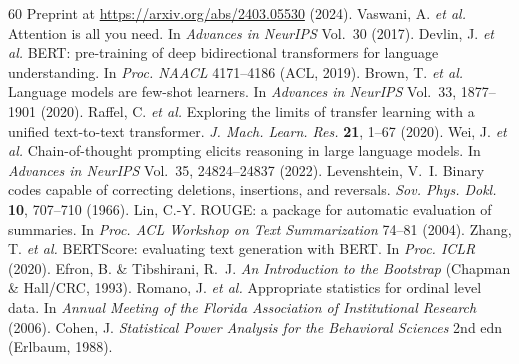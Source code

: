 \documentclass[sn-nature]{sn-jnl}
\begin{document}
\begin{thebibliography}{60}
Preprint at \url{https://arxiv.org/abs/2403.05530} (2024).
Vaswani, A. \emph{et al.}
Attention is all you need.
In \emph{Advances in NeurIPS} Vol.~30 (2017).
Devlin, J. \emph{et al.}
BERT: pre-training of deep bidirectional transformers for language understanding.
In \emph{Proc. NAACL} 4171--4186 (ACL, 2019).
Brown, T. \emph{et al.}
Language models are few-shot learners.
In \emph{Advances in NeurIPS} Vol.~33, 1877--1901 (2020).
Raffel, C. \emph{et al.}
Exploring the limits of transfer learning with a unified text-to-text transformer.
\emph{J. Mach. Learn. Res.} \textbf{21}, 1--67 (2020).
Wei, J. \emph{et al.}
Chain-of-thought prompting elicits reasoning in large language models.
In \emph{Advances in NeurIPS} Vol.~35, 24824--24837 (2022).
Levenshtein, V.~I.
Binary codes capable of correcting deletions, insertions, and reversals.
\emph{Sov. Phys. Dokl.} \textbf{10}, 707--710 (1966).
Lin, C.-Y.
ROUGE: a package for automatic evaluation of summaries.
In \emph{Proc. ACL Workshop on Text Summarization} 74--81 (2004).
Zhang, T. \emph{et al.}
BERTScore: evaluating text generation with BERT.
In \emph{Proc. ICLR} (2020).
Efron, B. \& Tibshirani, R.~J.
\emph{An Introduction to the Bootstrap} (Chapman \& Hall/CRC, 1993).
Romano, J. \emph{et al.}
Appropriate statistics for ordinal level data.
In \emph{Annual Meeting of the Florida Association of Institutional Research} (2006).
Cohen, J.
\emph{Statistical Power Analysis for the Behavioral Sciences} 2nd edn (Erlbaum, 1988).

\end{thebibliography}
\end{document}
